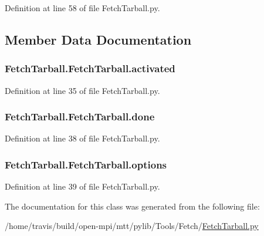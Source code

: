Definition at line 58 of file Fetch\-Tarball.\-py.



\subsection{Member Data Documentation}
\hypertarget{class_fetch_tarball_1_1_fetch_tarball_a4e6818fd64191913c3f302485c2c4e96}{
\subsubsection[{activated}]{\setlength{\rightskip}{0pt plus 5cm}Fetch\-Tarball.\-Fetch\-Tarball.\-activated}}\label{class_fetch_tarball_1_1_fetch_tarball_a4e6818fd64191913c3f302485c2c4e96}


Definition at line 35 of file Fetch\-Tarball.\-py.

\hypertarget{class_fetch_tarball_1_1_fetch_tarball_ae733fd553804854c3beef59df1739732}{
\subsubsection[{done}]{\setlength{\rightskip}{0pt plus 5cm}Fetch\-Tarball.\-Fetch\-Tarball.\-done}}\label{class_fetch_tarball_1_1_fetch_tarball_ae733fd553804854c3beef59df1739732}


Definition at line 38 of file Fetch\-Tarball.\-py.

\hypertarget{class_fetch_tarball_1_1_fetch_tarball_ae5c7611a1ef415c3e38c75ea803ef2e3}{
\subsubsection[{options}]{\setlength{\rightskip}{0pt plus 5cm}Fetch\-Tarball.\-Fetch\-Tarball.\-options}}\label{class_fetch_tarball_1_1_fetch_tarball_ae5c7611a1ef415c3e38c75ea803ef2e3}


Definition at line 39 of file Fetch\-Tarball.\-py.



The documentation for this class was generated from the following file\-:\begin{DoxyCompactItemize}
\item 
/home/travis/build/open-\/mpi/mtt/pylib/\-Tools/\-Fetch/\hyperlink{_fetch_tarball_8py}{Fetch\-Tarball.\-py}\end{DoxyCompactItemize}
